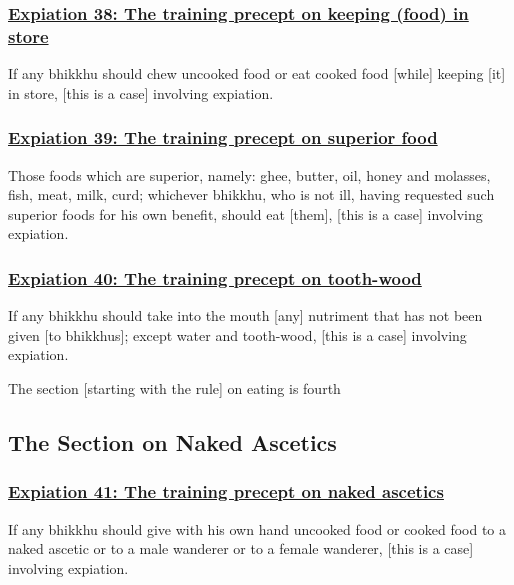 \subsubsection*{\hyperref[pac38]{Expiation 38: The training precept on keeping (food) in store}}
\label{exp38}
If any bhikkhu should chew uncooked food or eat cooked food [while] keeping [it] in store, [this is a case] involving expiation.



\subsubsection*{\hyperref[pac39]{Expiation 39: The training precept on superior food}}
\label{exp39}
Those foods which are superior, namely: ghee, butter, oil, honey and molasses, fish, meat, milk, curd; whichever bhikkhu, who is not ill, having requested such superior foods for his own benefit, should eat [them], [this is a case] involving expiation.



\subsubsection*{\hyperref[pac40]{Expiation 40: The training precept on tooth-wood}}
\label{exp40}
If any bhikkhu should take into the mouth [any] nutriment that has not been given [to bhikkhus]; except water and tooth-wood, [this is a case] involving expiation.

\begin{center}
	The section [starting with the rule] on eating is fourth
\end{center}



\setsubsecheadstyle{\subsectionFmt}
\subsection{The Section on Naked Ascetics}
\label{exp-vagga5}

\subsubsection*{\hyperref[pac41]{Expiation 41: The training precept on naked ascetics}}
\label{exp41}
If any bhikkhu should give with his own hand uncooked food or cooked food to a naked ascetic or to a male wanderer or to a female wanderer, [this is a case] involving expiation.



